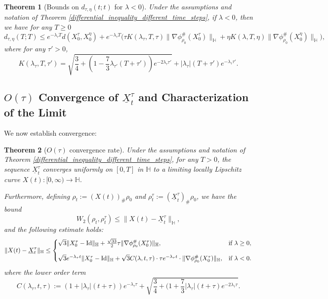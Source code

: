 \documentclass[11pt,a4paper]{amsart}
\newcommand{\1}{\mathds{1}}
\newtheorem{theorem}{\textbf{Theorem}}[section]
\numberwithin{equation}{section}
\begin{document}
\begin{theorem}[Bounds on $d_{\tau,\eta}(t;t)$ for $\lambda < 0$]  
Under the assumptions and notation of Theorem \ref{differential_inequality_different_time_steps}, if $\lambda < 0$, then we have for any $T \geq 0$
\[
d_{\tau,\eta}(T;T) \leq e^{-\lambda_{\tau} T} d(X_0^{\tau},X_0^{\eta}) 
+ e^{-\lambda_{\tau} T} \Big( \tau K(\lambda_{\tau},T,\tau) \|\nabla \phi^{\#}_{\rho_0}(X^{\tau}_0)\|_{\mathbb{H}} 
+ \eta K(\lambda,T,\eta) \|\nabla \phi^{\#}_{\rho_0}(X^{\eta}_0)\|_{\mathbb{H}} \Big),
\]
where for any $\tau' > 0$,
\begin{equation}
K(\lambda_{\tau},T,\tau') = \sqrt{ \frac{3}{4} + (1-\frac{7}{3}\lambda_{\tau'}(T+\tau')) e^{-2\lambda_{\tau} \tau'} } + |\lambda_{\tau}| (T+\tau')e^{-\lambda_{\tau} \tau'}. \label{K_constant}
\end{equation}
\label{neg_d_convg}
\end{theorem}  
 
    \subsection{$O(\tau)$ Convergence of $\underline{X}_t^{\tau}$ and Characterization of the Limit}


We now establish convergence:


\begin{theorem}[$O(\tau)$ convergence rate]  \label{linear_convergence_rate}
Under the assumptions and notation of Theorem \ref{differential_inequality_different_time_steps}, for any $T > 0$, the sequence $\underline{X}^{\tau}_t$ converges uniformly on $[0,T]$ in $\mathbb{H}$ to a limiting locally Lipschitz curve $X(t) : [0,\infty) \to \mathbb{H}$.  

\smallskip

\noindent Furthermore, defining $\rho_t := (X(t))_{\#} \rho_0$ and $\rho_t^{\tau} := (\underline{X}_t^{\tau})_{\#} \rho_0$, we have the bound
\[
W_2(\rho_t,\rho_t^{\tau}) \leq \|X(t) - \underline{X}_t^{\tau}\|_{\mathbb{H}},
\]
and the following estimate holds:
\[
\|X(t) - \underline{X}_t^{\tau}\|_{\mathbb{H}} \leq
\begin{cases}
    \sqrt{3} \|X_0^{\tau} - \textnormal{Id}\|_{\mathbb{H}} 
    + \frac{\sqrt{33}}{2}\tau \| \nabla \phi^{\#}_{\rho_0}(X^{\tau}_0)\|_{\mathbb{H}} 
    , & \text{if } \lambda \geq 0, \\[1em]
    \sqrt{3} e^{- \lambda_{\tau} t} \|X_0^{\tau} - \textnormal{Id}\|_{\mathbb{H}}  
    + \sqrt{3}   C(\lambda,t,\tau)  \cdot \tau e^{-\lambda_{\tau} t} \cdot
    \|\nabla \phi^{\#}_{\rho_0}(X_0^{\tau})\|_{\mathbb{H}}, & \text{if } \lambda < 0.
\end{cases}
\]
where the lower order term
\begin{equation}
C(\lambda_{\tau},t,\tau) :=   (1+|\lambda_{\tau}|(t+\tau))e^{-\lambda_{\tau} \tau}+ \sqrt{\frac{3}{4} + (1+\frac{7}{3}|\lambda_{\tau}|(t+\tau)e^{-2\lambda_{\tau} \tau}}. \label{C_definition}
\end{equation}

\label{streamline_convergence}
\end{theorem}
\end{document}
